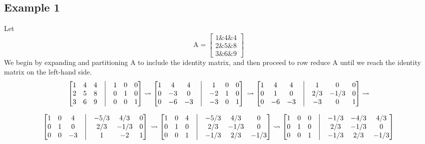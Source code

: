 \subsection{Example 1}
\label{sss:exam-acc3}

Let 
$$
\mathrm{A} = \begin{bmatrix}
  1 \& 4 \& 4 \\
    2 \& 5 \& 8 \\
      3 \& 6 \& 9
\end{bmatrix}
$$
We begin by expanding and partitioning A to include the identity matrix, and then proceed
to row reduce A until we reach the identity matrix on the left-hand side.
$$
\begin{bmatrix}
  1 & 4 & 4 & \big| & 1 & 0 & 0 \\
    2 & 5 & 8 & \big| & 0 & 1 & 0 \\
      3 & 6 & 9 & \big| & 0 & 0 & 1
\end{bmatrix}
\rightsquigarrow
\begin{bmatrix}
  1 & 4 & 4 & \big| & 1 & 0 & 0 \\
    0 & -3 & 0 & \big| & -2 & 1 & 0 \\
      0 & -6 & -3 & \big| & -3 & 0 & 1
\end{bmatrix}
\newline
\rightsquigarrow
\begin{bmatrix}
  1 & 4 & 4 & \big| & 1 & 0 & 0 \\
    0 & 1 & 0 & \big| & 2/3 & -1/3 & 0 \\
      0 & -6 & -3 & \big| & -3 & 0 & 1
\end{bmatrix}
\rightsquigarrow
$$

$$
\begin{bmatrix}
  1 & 0 & 4 & \big| & -5/3 & 4/3 & 0 \\
    0 & 1 & 0 & \big| & 2/3 & -1/3 & 0 \\
      0 & 0 & -3 & \big| & 1 & -2 & 1
\end{bmatrix}
\newline
\rightsquigarrow
\begin{bmatrix}
  1 & 0 & 4 & \big| & -5/3 & 4/3 & 0 \\
    0 & 1 & 0 & \big| & 2/3 & -1/3 & 0 \\
      0 & 0 & 1 & \big| & -1/3 & 2/3 & -1/3
\end{bmatrix}
\rightsquigarrow
\begin{bmatrix}
  1 & 0 & 0 & \big| & -1/3 & -4/3 & 4/3 \\
    0 & 1 & 0 & \big| & 2/3 & -1/3 & 0 \\
      0 & 0 & 1 & \big| & -1/3 & 2/3 & -1/3
\end{bmatrix}
$$


